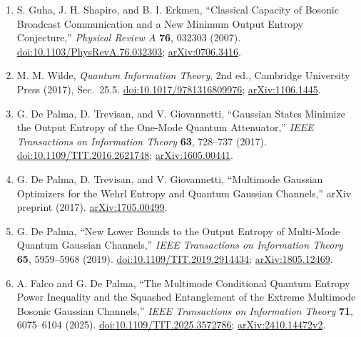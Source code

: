 \begin{enumerate}[label={},leftmargin=4.8em,labelsep=0.5em]
  \footnotesize
  \item[\textup{[GSE07]}]\label{ref:p75-guha-shapiro-erkmen}
  S. Guha, J. H. Shapiro, and B. I. Erkmen, ``Classical Capacity of Bosonic
  Broadcast Communication and a New Minimum Output Entropy Conjecture,''
  \emph{Physical Review A} \textbf{76}, 032303 (2007).
  \href{https://doi.org/10.1103/PhysRevA.76.032303}%
       {doi:10.1103/PhysRevA.76.032303};
  \href{https://arxiv.org/abs/0706.3416}{arXiv:0706.3416}.

  \item[\textup{[Wil17]}]\label{ref:p75-wilde}
  M. M. Wilde, \emph{Quantum Information Theory}, 2nd ed., Cambridge
  University Press (2017), Sec.~25.5.
  \href{https://doi.org/10.1017/9781316809976}%
       {doi:10.1017/9781316809976};
  \href{https://arxiv.org/abs/1106.1445}{arXiv:1106.1445}.

  \item[\textup{[DTG17]}]\label{ref:p75-de-palma-one-mode}
  G. De Palma, D. Trevisan, and V. Giovannetti, ``Gaussian States Minimize
  the Output Entropy of the One-Mode Quantum Attenuator,'' \emph{IEEE
  Transactions on Information Theory} \textbf{63}, 728--737 (2017).
  \href{https://doi.org/10.1109/TIT.2016.2621748}%
       {doi:10.1109/TIT.2016.2621748};
  \href{https://arxiv.org/abs/1605.00441}{arXiv:1605.00441}.

  \item[\textup{[DTG17b]}]\label{ref:p75-de-palma-multimode}
  G. De Palma, D. Trevisan, and V. Giovannetti, ``Multimode Gaussian
  Optimizers for the Wehrl Entropy and Quantum Gaussian Channels,'' arXiv
  preprint (2017).
  \href{https://arxiv.org/abs/1705.00499}{arXiv:1705.00499}.

  \item[\textup{[DP19]}]\label{ref:p75-de-palma-eb}
  G. De Palma, ``New Lower Bounds to the Output Entropy of Multi-Mode Quantum
  Gaussian Channels,'' \emph{IEEE Transactions on Information Theory}
  \textbf{65}, 5959--5968 (2019).
  \href{https://doi.org/10.1109/TIT.2019.2914434}%
       {doi:10.1109/TIT.2019.2914434};
  \href{https://arxiv.org/abs/1805.12469}{arXiv:1805.12469}.

  \item[\textup{[FDP25]}]\label{ref:p75-falco-de-palma}
  A. Falco and G. De Palma, ``The Multimode Conditional Quantum Entropy Power
  Inequality and the Squashed Entanglement of the Extreme Multimode Bosonic
  Gaussian Channels,'' \emph{IEEE Transactions on Information Theory}
  \textbf{71}, 6075--6104 (2025).
  \href{https://doi.org/10.1109/TIT.2025.3572786}%
       {doi:10.1109/TIT.2025.3572786};
  \href{https://arxiv.org/abs/2410.14472v2}{arXiv:2410.14472v2}.
\end{enumerate}

